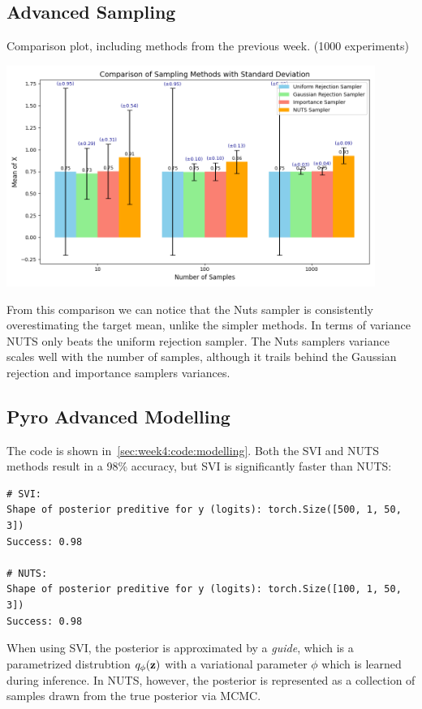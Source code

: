 \subsection{Advanced Sampling}
Comparison plot, including methods from the previous week. (1000 experiments)
\begin{center}
    \includegraphics[width=12cm]{./figures/comparison2.png}
\end{center}
From this comparison we can notice that the Nuts sampler is consistently overestimating the target mean, unlike the simpler methods.
In terms of variance NUTS only beats the uniform rejection sampler.
The Nuts samplers variance scales well with the number of samples, 
although it trails behind the Gaussian rejection and importance samplers variances.

\subsection{Pyro Advanced Modelling}

The code is shown in~\cref{sec:week4:code:modelling}.
Both the SVI and NUTS methods result in a 98\% accuracy,
but SVI is significantly faster than NUTS:

\begin{verbatim}
# SVI:
Shape of posterior preditive for y (logits): torch.Size([500, 1, 50, 3])
Success: 0.98

# NUTS:
Shape of posterior preditive for y (logits): torch.Size([100, 1, 50, 3])
Success: 0.98
\end{verbatim}

When using SVI, the posterior is approximated by a \emph{guide},
which is a parametrized distrubtion $q_{\phi}(\bm{\mathrm{z}})$ with a
variational parameter $\phi$ which is learned during inference.
In NUTS, however, the posterior is represented as a collection
of samples drawn from the true posterior via MCMC.


